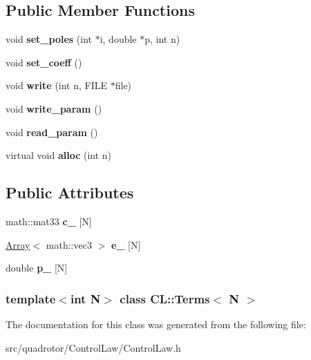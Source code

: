 \subsection*{\-Public \-Member \-Functions}
\begin{DoxyCompactItemize}
\item 
\hypertarget{classCL_1_1Terms_a4c473cd263b71294b675216a1ea5cb02}{void {\bfseries set\-\_\-poles} (int $\ast$i, double $\ast$p, int n)}\label{classCL_1_1Terms_a4c473cd263b71294b675216a1ea5cb02}

\item 
\hypertarget{classCL_1_1Terms_a6c45b26f23ec661fb439eb9f0ce567ab}{void {\bfseries set\-\_\-coeff} ()}\label{classCL_1_1Terms_a6c45b26f23ec661fb439eb9f0ce567ab}

\item 
\hypertarget{classCL_1_1Terms_a6aa95892ae24ceadeb80e4d3304bde27}{void {\bfseries write} (int n, \-F\-I\-L\-E $\ast$file)}\label{classCL_1_1Terms_a6aa95892ae24ceadeb80e4d3304bde27}

\item 
\hypertarget{classCL_1_1Terms_af23aca809572dbbf23c02c1abdcc3dce}{void {\bfseries write\-\_\-param} ()}\label{classCL_1_1Terms_af23aca809572dbbf23c02c1abdcc3dce}

\item 
\hypertarget{classCL_1_1Terms_a4aadf66009582c55492bcf52e67813b7}{void {\bfseries read\-\_\-param} ()}\label{classCL_1_1Terms_a4aadf66009582c55492bcf52e67813b7}

\item 
\hypertarget{classCL_1_1Terms_a5bcce9d5baf7d072fc48b1f99008b624}{virtual void {\bfseries alloc} (int n)}\label{classCL_1_1Terms_a5bcce9d5baf7d072fc48b1f99008b624}

\end{DoxyCompactItemize}
\subsection*{\-Public \-Attributes}
\begin{DoxyCompactItemize}
\item 
\hypertarget{classCL_1_1Terms_a140440a957456b8a1444dec9398ebb6e}{math\-::mat33 {\bfseries c\-\_\-} \mbox{[}\-N\mbox{]}}\label{classCL_1_1Terms_a140440a957456b8a1444dec9398ebb6e}

\item 
\hypertarget{classCL_1_1Terms_aea3a6c9598212abff50042ffc62c6616}{\hyperlink{classArray}{\-Array}$<$ math\-::vec3 $>$ {\bfseries e\-\_\-} \mbox{[}\-N\mbox{]}}\label{classCL_1_1Terms_aea3a6c9598212abff50042ffc62c6616}

\item 
\hypertarget{classCL_1_1Terms_aa45b4ef4e3452c250ae7c7132f0cdde7}{double {\bfseries p\-\_\-} \mbox{[}\-N\mbox{]}}\label{classCL_1_1Terms_aa45b4ef4e3452c250ae7c7132f0cdde7}

\end{DoxyCompactItemize}
\subsubsection*{template$<$int \-N$>$ class C\-L\-::\-Terms$<$ N $>$}



\-The documentation for this class was generated from the following file\-:\begin{DoxyCompactItemize}
\item 
src/quadrotor/\-Control\-Law/\-Control\-Law.\-h\end{DoxyCompactItemize}

